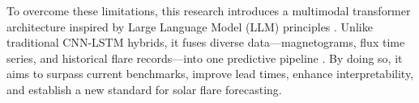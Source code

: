 To overcome these limitations, this research introduces a multimodal transformer architecture inspired by Large Language Model (LLM) principles \citep{RefWorks:RefID:3-vaswani2023provided}. Unlike traditional CNN-LSTM hybrids, it fuses diverse data—magnetograms, flux time series, and historical flare records—into one predictive pipeline \citep{RefWorks:RefID:2-abduallah2023operational, RefWorks:RefID:30-schmude2024prithvi}. By doing so, it aims to surpass current benchmarks, improve lead times, enhance interpretability, and establish a new standard for solar flare forecasting.
